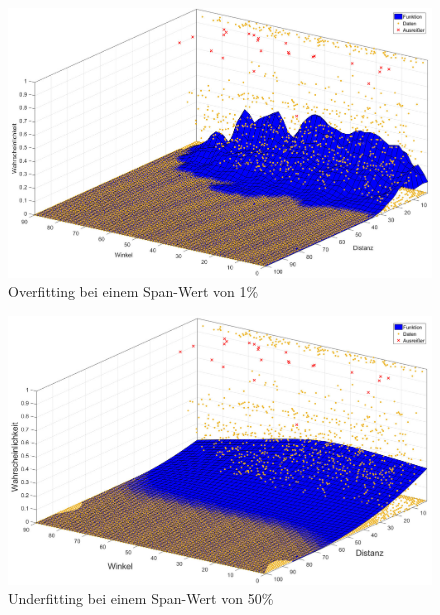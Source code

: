 \begin{figure}[H]
\centering
\includegraphics[scale=0.34]{se-wa-jpg/splinewdTM}
\caption{Overfitting bei einem Span-Wert von 1\%}
\label{splinewdTM}
\end{figure}

\begin{figure}[H]
\centering
\includegraphics[scale=0.34]{se-wa-jpg/splinewdTL}
\caption{Underfitting bei einem Span-Wert von 50\%}
\label{splinewdTL}
\end{figure}
